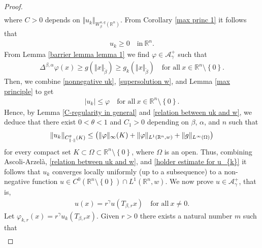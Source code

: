 \documentclass[10pt, leqno]{article}
\theoremstyle{definition}
\theoremstyle{remark}
\numberwithin{equation}{section}
\begin{document}
\begin{proof}
\begin{eqnarray}
\end{eqnarray}
where $C>0$ depends on $\Vert u_{k} \Vert_{W_{\beta}^{\alpha, q}(\mathbb{R}^{n})}$. From Corollary \ref{max princ 1} it follows that
\begin{eqnarray}
\label{nonnegative uk}
u_{k} \geq 0 \quad \text{in} \ \mathbb{R}^{n}.
\end{eqnarray}
From Lemma \ref{barrier lemma lemma 1} we find $\varphi \in \mathcal{A_{\gamma}^{+}}$ such that
\begin{eqnarray}
\label{supersolution w}
 \Delta^{\beta, \alpha}\varphi(x) \geq g\left( \Vert x \Vert_{\tilde{\beta}}^{} \right) \geq g_{k}\left(\Vert x \Vert^{}_{\tilde{\beta}}\right) \quad \text{for all} \ x \in \mathbb{R}^{n} \setminus \left\lbrace 0 \right\rbrace.
\end{eqnarray}
Then, we combine \eqref{nonnegative uk}, \eqref{supersolution w}, and Lemma \ref{max principle} to get
\begin{eqnarray}
\label{relation between uk and w}
 \vert u_{k} \vert \leq \varphi  \quad \text{for all} \ x \in \mathbb{R}^{n} \setminus \left\lbrace 0 \right\rbrace.
\end{eqnarray}
Hence, by Lemma \ref{C-regularity in general} and \eqref{relation between uk and w}, we deduce that there exist $0< \theta < 1$ and $C_{1}> 0$ depending on $\beta$, $\alpha$, and $n$ such that
\begin{eqnarray}
\label{holder estimate for u_{k}}
 \Vert u_{k} \Vert_{C^{\theta}_{\Vert \cdot \Vert}(K)} \leq  \left( \Vert \varphi \Vert_{\infty}(K)+ \Vert \varphi \Vert_{ L^{1} (\mathbb{R}^{n}, w)} + \Vert g \Vert_{L^{\infty}(\Omega)} \right)
\end{eqnarray}
for every compact set $K \subset \Omega \subset \mathbb{R}^{n} \setminus \left\lbrace 0 \right\rbrace$, where $\Omega$ is an open. Thus, combining Ascoli-Arzel\`a, \eqref{relation between uk and w}, and \eqref{holder estimate for u_{k}} it follows that $u_{k}$ converges locally uniformly (up to a subsequence) to a non-negative function $u\in C^{0}\left( \mathbb{R}^{n} \setminus \left\lbrace 0 \right\rbrace \right) \cap L^{1} (\mathbb{R}^{n}, w)$.
We now prove $u \in \mathcal{A}^{+}_{\gamma}$, that is,
\begin{eqnarray}
\label{homogen. of u}
u(x) = r^{\gamma}u(T_{\beta,r}x) \quad \text{for all} \ x \neq 0.
\end{eqnarray}
Let $\varphi_{k,r}(x) = r^{\gamma}u_{k}(T_{\beta,r}x)$. Given $r>0$ there exists a natural number $m$ such that
\begin{eqnarray}

\end{eqnarray}
\end{proof}
\end{document}
